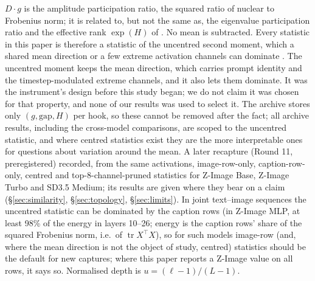 \documentclass[11pt]{article}
\newcommand{\gap}{\mathrm{gap}}
\begin{document}
$D\cdot g$ is the amplitude participation ratio, the squared ratio of nuclear to Frobenius norm; it is related to, but not the same as, the eigenvalue participation ratio \citep{gao2017theory} and the effective rank $\exp(H)$ of \citet{roy2007effective}. No mean is subtracted. Every statistic in this paper is therefore a statistic of the uncentred second moment, which a shared mean direction or a few extreme activation channels can dominate \citep{sun2024massive,gan2025massive}. The uncentred moment keeps the mean direction, which carries prompt identity and the timestep-modulated extreme channels, and it also lets them dominate. It was the instrument's design before this study began; we do not claim it was chosen for that property, and none of our results was used to select it. The archive stores only $(g,\gap,H)$ per hook, so these cannot be removed after the fact; all archive results, including the cross-model comparisons, are scoped to the uncentred statistic, and where centred statistics exist they are the more interpretable ones for questions about variation around the mean. A later recapture (Round 11, preregistered) recorded, from the same activations, image-row-only, caption-row-only, centred and top-8-channel-pruned statistics for Z-Image Base, Z-Image Turbo and SD3.5 Medium; its results are given where they bear on a claim (\S\ref{sec:similarity}, \S\ref{sec:topology}, \S\ref{sec:limits}). In joint text--image sequences the uncentred statistic can be dominated by the caption rows (in Z-Image MLP, at least 98\% of the energy in layers 10--26; energy is the caption rows' share of the squared Frobenius norm, i.e.\ of $\operatorname{tr} X^\top X$), so for such models image-row (and, where the mean direction is not the object of study, centred) statistics should be the default for new captures; where this paper reports a Z-Image value on all rows, it says so. Normalised depth is $u=(\ell-1)/(L-1)$.
\end{document}

